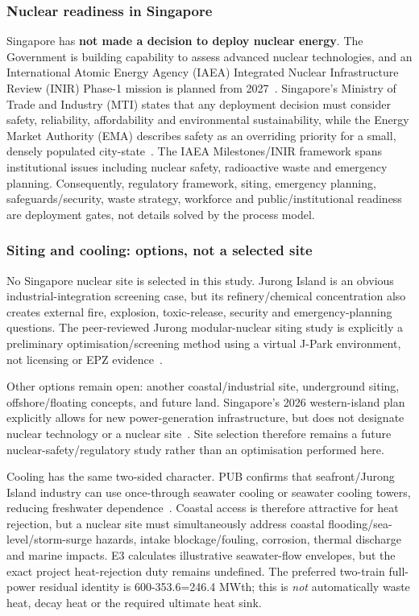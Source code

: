\subsubsection{Nuclear readiness in Singapore}
Singapore has \textbf{not made a decision to deploy nuclear energy}. The Government is building capability to assess advanced nuclear technologies, and an International Atomic Energy Agency (IAEA) Integrated Nuclear Infrastructure Review (INIR) Phase-1 mission is planned from 2027~\cite{mti2026inir}. Singapore's Ministry of Trade and Industry (MTI) states that any deployment decision must consider safety, reliability, affordability and environmental sustainability, while the Energy Market Authority (EMA) describes safety as an overriding priority for a small, densely populated city-state~\cite{mti2026safetycriteria,ema2026safety}. The IAEA Milestones/INIR framework spans institutional issues including nuclear safety, radioactive waste and emergency planning. Consequently, regulatory framework, siting, emergency planning, safeguards/security, waste strategy, workforce and public/institutional readiness are deployment gates, not details solved by the process model.

\subsubsection{Siting and cooling: options, not a selected site}
No Singapore nuclear site is selected in this study.  Jurong Island is an obvious industrial-integration screening case, but its refinery/chemical concentration also creates external fire, explosion, toxic-release, security and emergency-planning questions.  The peer-reviewed Jurong modular-nuclear siting study is explicitly a preliminary optimisation/screening method using a virtual J-Park environment, not licensing or EPZ evidence~\cite{devanand2019siting}.

Other options remain open: another coastal/industrial site, underground siting, offshore/floating concepts, and future land.  Singapore's 2026 western-island plan explicitly allows for new power-generation infrastructure, but does not designate nuclear technology or a nuclear site~\cite{govsg2026western}.  Site selection therefore remains a future nuclear-safety/regulatory study rather than an optimisation performed here.

Cooling has the same two-sided character.  PUB confirms that seafront/Jurong Island industry can use once-through seawater cooling or seawater cooling towers, reducing freshwater dependence~\cite{pubseawater2026}.  Coastal access is therefore attractive for heat rejection, but a nuclear site must simultaneously address coastal flooding/sea-level/storm-surge hazards, intake blockage/fouling, corrosion, thermal discharge and marine impacts.  E3 calculates illustrative seawater-flow envelopes, but the exact project heat-rejection duty remains undefined. The preferred two-train full-power residual identity is 600-353.6=246.4 MWth; this is \emph{not} automatically waste heat, decay heat or the required ultimate heat sink.

